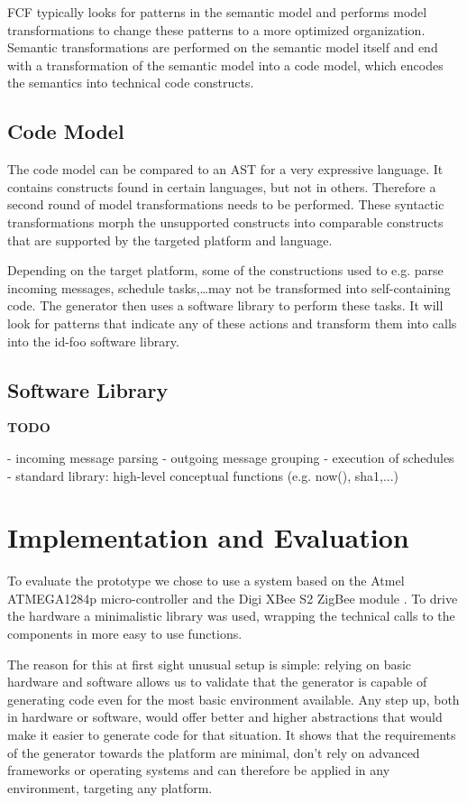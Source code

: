 \documentclass[conference]{IEEEtran}
\newcommand{\TODO}{\textbf{\color{red}TODO}}
\newcommand{\NAME}{id-foo\xspace}
\begin{document}
FCF typically looks for patterns in the semantic model and performs model
transformations to change these patterns to a more optimized organization.
Semantic transformations are performed on the semantic model itself and end
with a transformation of the semantic model into a code model, which encodes
the semantics into technical code constructs.

\subsection{Code Model}

The code model can be compared to an AST for a very expressive language. It
contains constructs found in certain languages, but not in others. Therefore a
second round of model transformations needs to be performed. These syntactic
transformations morph the unsupported constructs into comparable constructs
that are supported by the targeted platform and language.

Depending on the target platform, some of the constructions used to e.g. parse
incoming messages, schedule tasks,\dots may not be transformed into
self-containing code. The generator then uses a software library to perform
these tasks. It will look for patterns that indicate any of these actions and
transform them into calls into the \NAME software library.

\subsection{Software Library}

\TODO

- incoming message parsing
- outgoing message grouping
- execution of schedules
- standard library: high-level conceptual functions (e.g. now(), sha1,...)

\section{Implementation and Evaluation}
\label{evaluation}

To evaluate the prototype we chose to use a system based on the Atmel
ATMEGA1284p micro-controller \cite{datasheet:atmega1284p} and the Digi XBee S2
ZigBee module \cite{manual:xbee}. To drive the hardware a minimalistic library
was used, wrapping the technical calls to the components in more easy to use
functions.

The reason for this at first sight unusual setup is simple: relying on basic
hardware and software allows us to validate that the generator is capable of
generating code even for the most basic environment available. Any step up,
both in hardware or software, would offer better and higher abstractions that
would make it easier to generate code for that situation. It shows that the
requirements of the generator towards the platform are minimal, don't rely on
advanced frameworks or operating systems and can therefore be applied in any
environment, targeting any platform.
\end{document}
